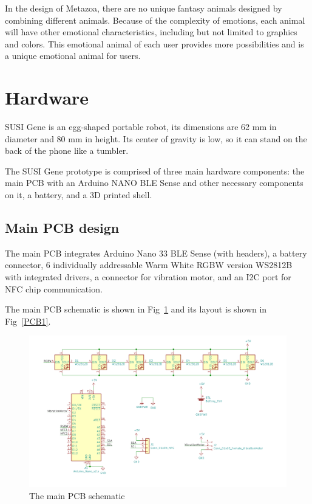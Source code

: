 \documentclass[manuscript,screen]{acmart}
\begin{document}
In the design of Metazoa, there are no unique fantasy animals designed by combining different animals. Because of the complexity of emotions, each animal will have other emotional characteristics, including but not limited to graphics and colors. This emotional animal of each user provides more possibilities and is a unique emotional animal for users.

\section{Hardware}

SUSI Gene is an egg-shaped portable robot, its dimensions are 62 mm in diameter and 80 mm in height. Its center of gravity is low, so it can stand on the back of the phone like a tumbler.

The SUSI Gene prototype is comprised of three main hardware components: the main PCB with an Arduino NANO BLE Sense and other necessary components on it, a battery, and a 3D printed shell.

\subsection{Main PCB design}

The main PCB integrates Arduino Nano 33 BLE Sense (with headers), a battery connector, 6 individually addressable Warm White RGBW version WS2812B with integrated drivers, a connector for vibration motor, and an I2C port for NFC chip communication.

The main PCB schematic is shown in Fig~\ref{PCBsch1} and its layout is shown in Fig~\ref{PCB1}.

\begin{figure}[h]
  \centering
  \includegraphics[width=\linewidth]{PCBsch1.png}
  \caption{The main PCB schematic}
  \label{PCBsch1}
\end{figure}
\end{document}
